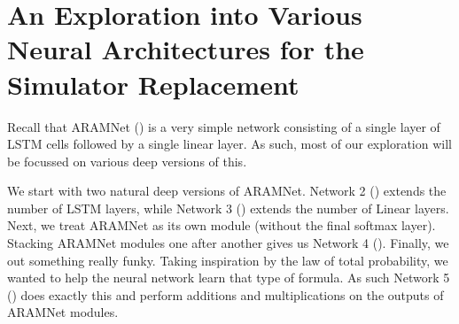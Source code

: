 \section{An Exploration into Various Neural Architectures for the Simulator Replacement}\label{Appendix:Networks}

Recall that ARAMNet () is a very simple network consisting of a single layer of LSTM cells followed by a single linear layer.
As such, most of our exploration will be focussed on various deep versions of this.

We start with two natural deep versions of ARAMNet.
Network 2 () extends the number of LSTM layers, while Network 3 () extends the number of Linear layers.
Next, we treat ARAMNet as its own module (without the final softmax layer).
Stacking ARAMNet modules one after another gives us Network 4 ().
Finally, we out something really funky.
Taking inspiration by the law of total probability, we wanted to help the neural network learn that type of formula.
As such Network 5 () does exactly this and perform additions and multiplications on the outputs of ARAMNet modules. 

